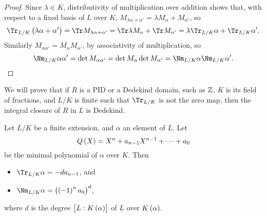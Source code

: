 \begin{proof}
Since $ \lambda \in K $, distributivity of multiplication over addition shows that, with respect to a fixed basis of $ L $ over $ K $, $ M_{\lambda\alpha + \alpha'} = \lambda M_\alpha + M_{\alpha'} $, so
$$ \Tr_{L / K} \br{\lambda\alpha + \alpha'} = \Tr M_{\lambda\alpha + \alpha'} = \Tr \lambda M_\alpha + \Tr M_{\alpha'} = \lambda \Tr_{L / K} \alpha + \Tr_{L / K} \alpha'. $$
Similarly $ M_{\alpha\alpha'} = M_\alpha M_{\alpha'} $, by associativity of multiplication, so
$$ \Nm_{L / K} \alpha\alpha' = \det M_{\alpha\alpha'} = \det M_\alpha\det M_{\alpha'} = \Nm_{L / K} \alpha\Nm_{L / K} \alpha'. $$
\end{proof}

We will prove that if $ R $ is a PID or a Dedekind domain, such as $ \mathbb{Z} $, $ K $ is its field of fractions, and $ L / K $ is finite such that $ \Tr_{L / K} $ is not the zero map, then the integral closure of $ R $ in $ L $ is Dedekind.


\begin{proposition}
\label{prop:12.2.2}
Let $ L / K $ be a finite extension, and $ \alpha $ an element of $ L $. Let
$$ Q\br{X} = X^n + a_{n - 1}X^{n - 1} + \dots + a_0 $$
be the minimal polynomial of $ \alpha $ over $ K $. Then
\begin{itemize}
\item $ \Tr_{L / K} \alpha = -da_{n - 1} $, and
\item $ \Nm_{L / K} \alpha = \br{\br{-1}^na_0}^d $,
\end{itemize}
where $ d $ is the degree $ \sbr{L : K\br{\alpha}} $ of $ L $ over $ K\br{\alpha} $.
\end{proposition}

\pagebreak

